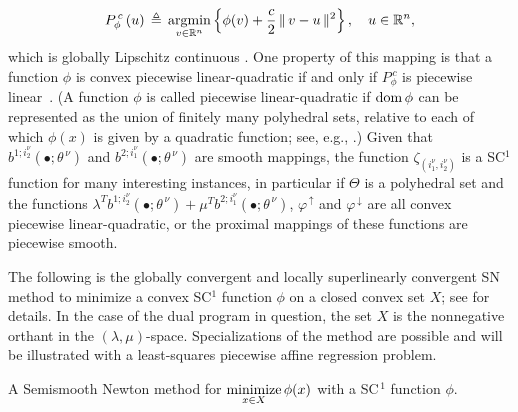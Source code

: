 \documentclass{siamart}
\begin{document}
$$
P^{\,c}_\phi\,(u) \,\triangleq\, \operatornamewithlimits{\mbox{argmin}}_{v\in \mathbb{R}^n} \left\{\phi(v) + \frac{c}{2}\,\|\,v-u\,\|^2\right\},\quad u\in \mathbb{R}^n,
$$
which is globally Lipschitz continuous \cite[Proposition 12.27]{BauschkeCombettes11}.  One property of this mapping is that a function $\phi$ is convex piecewise linear-quadratic if and only if $P_\phi^{\,c}$ is piecewise linear~\cite[Proposition 12.30]{RockafellarRWets98}. (A function $\phi$ is called piecewise linear-quadratic if ${\rm dom}\,\phi$
can be represented as the union of finitely many polyhedral sets, relative to each of which $\phi(x)$ is given by a quadratic function;
see, e.g., \cite[Definition 10.20]{RockafellarRWets98}.)
Given that $b^{1;i_2^{\nu}}(\bullet;\theta^{\, \nu})$ and $b^{2;i_1^{\nu}}(\bullet;\theta^{\, \nu})$ are smooth mappings,
the function $\zeta_{(i_1^{\nu},i_2^{\nu})}$ is a SC$^1$ function for many interesting instances, in particular if $\Theta$ is a polyhedral set
and the functions $\lambda^T b^{1;i_2^{\nu}}(\bullet;\theta^{\, \nu}) + \mu^T b^{2;i_1^{\nu}}(\bullet;\theta^{\, \nu})$,
$\varphi^{\,\uparrow}$ and $\varphi^{\,\downarrow}$ are all convex piecewise linear-quadratic,
or the proximal mappings of these functions are piecewise smooth.



The following is the globally convergent and locally superlinearly convergent SN method to minimize a convex SC$^1$ function $\phi$ on
a closed convex set $X$; see \cite{PangQi1995} for details.  In the case of the dual program in question, the set $X$ is the
nonnegative orthant in the $(\lambda,\mu)$-space.  Specializations of the method are possible and will be illustrated with a
least-squares piecewise affine regression problem.

\noindent\makebox[\linewidth]{\rule{\textwidth}{1pt}}

\noindent A Semismooth Newton method for $\displaystyle{
\operatornamewithlimits{\mbox{minimize}}_{x \in X}
} \, \phi(x)$ with a SC$^{\, 1}$ function $\phi$.

\noindent\makebox[\linewidth]{\rule{\textwidth}{1pt}}
\end{document}
